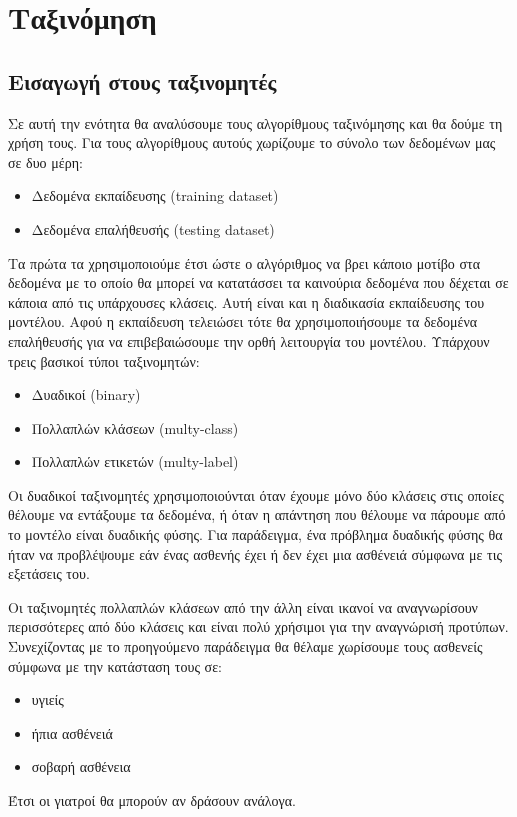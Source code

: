 \newpage
\section{Ταξινόμηση}
\subsection{Εισαγωγή στους ταξινομητές}
Σε αυτή την ενότητα θα αναλύσουμε τους αλγορίθμους
ταξινόμησης και θα δούμε τη χρήση τους. Για τους αλγορίθμους
αυτούς χωρίζουμε το σύνολο των δεδομένων μας σε δυο μέρη:
\begin{itemize}
    \item Δεδομένα εκπαίδευσης (\textlatin{training dataset})
    \item Δεδομένα επαλήθευσής (\textlatin{testing dataset})
\end{itemize}
Τα πρώτα τα χρησιμοποιούμε έτσι ώστε ο αλγόριθμος να βρει
κάποιο μοτίβο στα δεδομένα με το οποίο θα μπορεί να
κατατάσσει τα καινούρια δεδομένα που δέχεται σε κάποια
από τις υπάρχουσες κλάσεις. Αυτή είναι και η διαδικασία
εκπαίδευσης του μοντέλου. Αφού η εκπαίδευση τελειώσει τότε
θα χρησιμοποιήσουμε τα δεδομένα επαλήθευσής για να
επιβεβαιώσουμε την ορθή λειτουργία του μοντέλου.
Υπάρχουν τρεις βασικοί τύποι ταξινομητών:
\begin{itemize}
    \item Δυαδικοί (\textlatin{binary})
    \item Πολλαπλών κλάσεων (\textlatin{multy-class})
    \item Πολλαπλών ετικετών (\textlatin{multy-label})
\end{itemize}

Οι δυαδικοί ταξινομητές χρησιμοποιούνται όταν έχουμε μόνο
δύο κλάσεις στις οποίες θέλουμε να εντάξουμε τα δεδομένα,
ή όταν η απάντηση που θέλουμε να πάρουμε από το μοντέλο
είναι δυαδικής φύσης. Για παράδειγμα, ένα πρόβλημα δυαδικής
φύσης θα ήταν να προβλέψουμε εάν ένας ασθενής έχει ή δεν
έχει μια ασθένειά σύμφωνα με τις εξετάσεις του.

Οι ταξινομητές πολλαπλών κλάσεων από την άλλη είναι ικανοί
να αναγνωρίσουν περισσότερες από δύο κλάσεις και είναι πολύ
χρήσιμοι για την αναγνώρισή προτύπων. Συνεχίζοντας με το
προηγούμενο παράδειγμα θα θέλαμε χωρίσουμε τους ασθενείς
σύμφωνα με την κατάσταση τους σε:
\begin{itemize}
    \item υγιείς
    \item ήπια ασθένειά
    \item σοβαρή ασθένεια
\end{itemize}
Έτσι οι γιατροί θα μπορούν αν δράσουν ανάλογα.

